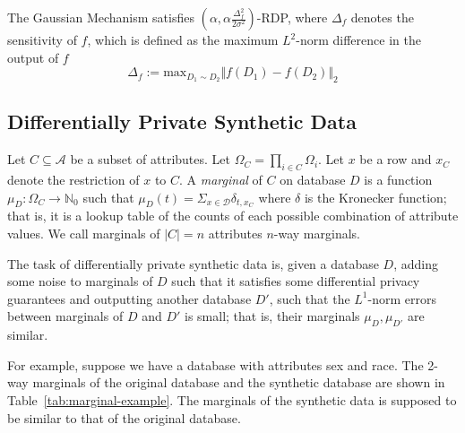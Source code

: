 \documentclass[manuscript,screen,review,anonymous]{acmart}
\renewcommand{\implies}{\rightarrow}
\newcommand{\db}{D}
\begin{document}
\begin{theorem}
The Gaussian Mechanism satisfies $(\alpha, \alpha \frac{\Delta^2_f}{2 \sigma^2})$-RDP, where $\Delta_f$ denotes the sensitivity\cite{dwork2014algorithmic} of $f$, which is defined as the maximum $L^2$-norm difference in the output of $f$
\[
\Delta_f := \text{max}_{\db_1 \sim \db_2} \Vert f(\db_1) - f(\db_2) \Vert_2
\]
\end{theorem}

\subsection{Differentially Private Synthetic Data}

Let $C \subseteq \mathcal{A}$ be a subset of attributes. Let $\Omega_C = \prod_{i \in C} \Omega_i$. Let $x$ be a row and $x_C$ denote the restriction of $x$ to $C$. A \emph{marginal}\cite{barak2007privacy,mckenna2021winning} of $C$ on database $\db$ is a function $\mu_{\db} : \Omega_C \implies \mathbb{N}_0$ such that $\mu_{\db}(t) = \Sigma_{x \in \mathcal{\db}} \delta_{t,{x_C}}$ where $\delta$ is the Kronecker function; that is, it is a lookup table of the counts of each possible combination of attribute values. We call marginals of $|C| = n$ attributes $n$-way marginals.

The task of differentially private synthetic data\cite{Ullman2022,McKenna2022,NIST_Differentially_Private_Synthetic_Data,YouTube_Differentially_Private_Synthetic_Data} is, given a database $\db$, adding some noise to marginals of $\db$ such that it satisfies some differential privacy guarantees and outputting another database $\db'$, such that the $L^1$-norm errors between marginals of $\db$ and $\db'$ is small; that is, their marginals $\mu_{\db},\mu_{\db'}$ are similar.

For example, suppose we have a database with attributes sex and race. The 2-way marginals of the original database and the synthetic database are shown in Table~\ref{tab:marginal-example}. The marginals of the synthetic data is supposed to be similar to that of the original database.
\end{document}
